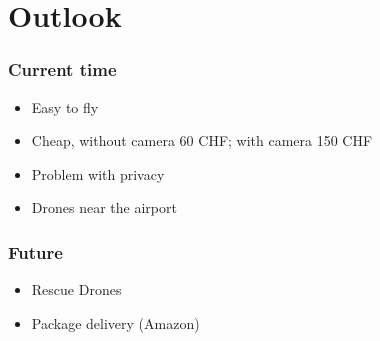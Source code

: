 \section{Outlook}

\begin{frame}
\tableofcontents[
    currentsection, 
    sectionstyle=show/shaded, 
    subsectionstyle=hide
]
\end{frame}


\begin{frame}
\frametitle{Current time}

  \begin{itemize}
    \item Easy to fly
    \item Cheap, without camera 60 CHF; with camera 150 CHF 
    \item Problem with privacy    
    \item Drones near the airport
  \end{itemize}
\end{frame}

\begin{frame}
\frametitle{Future}

  \begin{itemize}
    \item Rescue Drones   
    \item Package delivery (Amazon)
  \end{itemize}
\end{frame}


